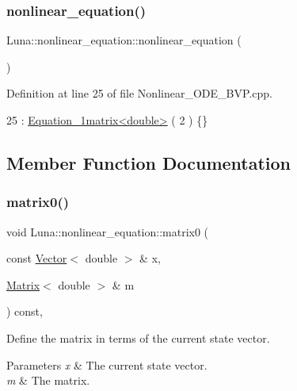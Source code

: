 \subsubsection{\texorpdfstring{nonlinear\+\_\+equation()}{nonlinear\_equation()}}
{\footnotesize\ttfamily Luna\+::nonlinear\+\_\+equation\+::nonlinear\+\_\+equation (\begin{DoxyParamCaption}{ }\end{DoxyParamCaption})\hspace{0.3cm}{\ttfamily [inline]}}



Definition at line 25 of file Nonlinear\+\_\+\+O\+D\+E\+\_\+\+B\+V\+P.\+cpp.


\begin{DoxyCode}
25 : \hyperlink{classLuna_1_1Equation__1matrix}{Equation\_1matrix<double>} ( 2 ) \{\}
\end{DoxyCode}


\subsection{Member Function Documentation}
\mbox{\label{classLuna_1_1nonlinear__equation_a467d48cbfdb69fddc877e00dc24a397a}} 
\subsubsection{\texorpdfstring{matrix0()}{matrix0()}}
{\footnotesize\ttfamily void Luna\+::nonlinear\+\_\+equation\+::matrix0 (\begin{DoxyParamCaption}\item[{const \hyperlink{classLuna_1_1Vector}{Vector}$<$ double $>$ \&}]{x,  }\item[{\hyperlink{classLuna_1_1Matrix}{Matrix}$<$ double $>$ \&}]{m }\end{DoxyParamCaption}) const\hspace{0.3cm}{\ttfamily [inline]}, {\ttfamily [virtual]}}



Define the matrix in terms of the current state vector. 


\begin{DoxyParams}{Parameters}
{\em x} & The current state vector. \\
\hline
{\em m} & The matrix. \\
\hline
\end{DoxyParams}



